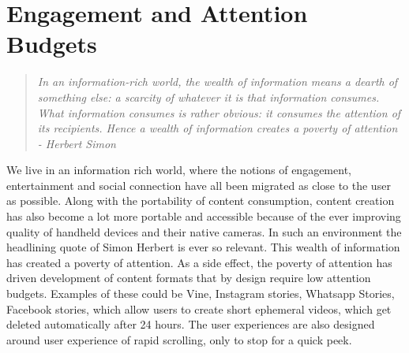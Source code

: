 
\chapter{Engagement and Attention Budgets}

\graphicspath{{Chapter2_vine/plots/}}
\begin{quote}
    
    \textsl{In an information-rich world, the wealth of information means a  dearth of something else: a  scarcity of whatever it  is that information consumes. What information consumes is  rather obvious: it consumes the attention of its recipients. Hence a wealth of information creates a poverty of attention - Herbert Simon}\cite{simon1971designing}
    
\end{quote}
We live in an information rich world, where the notions of engagement, entertainment and social connection have all been migrated as close to the user as possible. Along with the portability of content consumption, content creation has also become a lot more portable and accessible because of the ever improving quality of handheld devices and their native cameras. In such an environment the headlining quote of Simon Herbert is ever so relevant. This wealth of information has created a poverty of attention. As a side effect, the poverty of attention has driven development of content formats that by design require low attention budgets. Examples of these could be Vine, Instagram stories, Whatsapp Stories, Facebook stories,  which allow users to create short ephemeral videos, which get deleted automatically after 24 hours. The user experiences are also designed around user experience of rapid scrolling, only to stop for a quick peek. 

